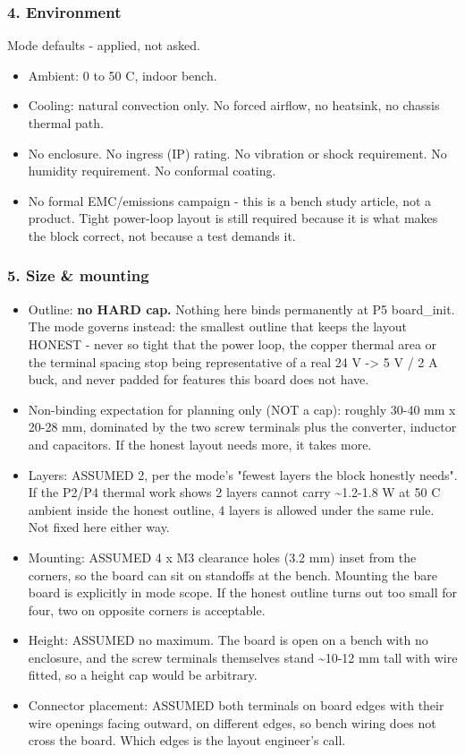 \documentclass[11pt,a4paper]{article}
\begin{document}
\subsubsection*{4. Environment}
Mode defaults - applied, not asked.

\begin{itemize}
\item Ambient: 0 to 50 C, indoor bench.
\item Cooling: natural convection only. No forced airflow, no heatsink, no
chassis thermal path.
\item No enclosure. No ingress (IP) rating. No vibration or shock
requirement. No humidity requirement. No conformal coating.
\item No formal EMC/emissions campaign - this is a bench study article, not a
product. Tight power-loop layout is still required because it is what
makes the block correct, not because a test demands it.
\end{itemize}
\subsubsection*{5. Size \& mounting}
\begin{itemize}
\item Outline: \textbf{no HARD cap.} Nothing here binds permanently at P5
board\_init. The mode governs instead: the smallest outline that keeps
the layout HONEST - never so tight that the power loop, the copper
thermal area or the terminal spacing stop being representative of a
real 24 V -\textgreater{} 5 V / 2 A buck, and never padded for features this board
does not have.
\item Non-binding expectation for planning only (NOT a cap): roughly
30-40 mm x 20-28 mm, dominated by the two screw terminals plus the
converter, inductor and capacitors. If the honest layout needs more,
it takes more.
\item Layers: ASSUMED 2, per the mode's "fewest layers the block honestly
needs". If the P2/P4 thermal work shows 2 layers cannot carry \textasciitilde{}1.2-1.8 W
at 50 C ambient inside the honest outline, 4 layers is allowed under the
same rule. Not fixed here either way.
\item Mounting: ASSUMED 4 x M3 clearance holes (3.2 mm) inset from the
corners, so the board can sit on standoffs at the bench. Mounting the
bare board is explicitly in mode scope. If the honest outline turns out
too small for four, two on opposite corners is acceptable.
\item Height: ASSUMED no maximum. The board is open on a bench with no
enclosure, and the screw terminals themselves stand \textasciitilde{}10-12 mm tall with
wire fitted, so a height cap would be arbitrary.
\item Connector placement: ASSUMED both terminals on board edges with their
wire openings facing outward, on different edges, so bench wiring does
not cross the board. Which edges is the layout engineer's call.
\end{itemize}
\end{document}
